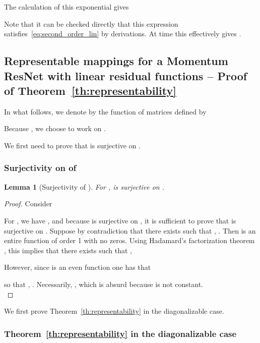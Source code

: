 \documentclass{article}
\newtheorem{lemma}{Lemma}
\begin{document}
The calculation of this exponential gives

Note that it can be checked directly that this expression satisfies~\eqref{eq:second_order_lin} by derivations.
At time  this effectively gives .

\subsection{Representable mappings for a Momentum ResNet with linear residual functions -- Proof of Theorem~\ref{th:representability}}\label{app:th_representability}

In what follows, we denote by  the function of matrices defined by 

Because , we choose to work on . 


We first need to prove that  is surjective on .

\subsubsection{Surjectivity on  of }
\begin{lemma}[Surjectivity of ]\label{lemma:surjectivity}
For ,  is surjective on . 
\end{lemma}

\begin{proof}
Consider

For , we have , and because  is surjective on , it is sufficient to prove that  is surjective on .
Suppose by contradiction that there exists  such that , .
Then  is an entire function  \cite{levin1996lectures} of order 1 with no zeros. Using Hadamard's factorization theorem \cite{conway2012functions}, this implies that there exists  such that , 

However, since  is an even function one has that  

so that , . Necessarily, , which is absurd because  is not constant.\\
\end{proof}

We first prove Theorem~\ref{th:representability} in the diagonalizable case. 
\subsubsection{Theorem~\ref{th:representability} in the diagonalizable case}
\end{document}
